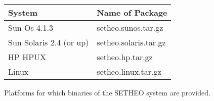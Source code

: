 \begin{figure}[htb]

\begin{center}
\begin{tabular}{|l|l|}
\hline
System  &  Name of Package  \\ \hline
Sun Os 4.1.3  &  setheo.sunos.tar.gz  \\
Sun Solaris 2.4 (or up)  &  setheo.solaris.tar.gz  \\
HP HPUX  &  setheo.hp.tar.gz  \\
Linux  &  setheo.linux.tar.gz  \\ \hline
\end{tabular}
\end{center}

\caption{Platforms for which binaries of the SETHEO system are
         provided.}\label{fig:platforms} 
\end{figure}